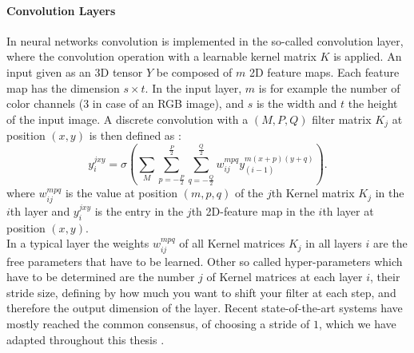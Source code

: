 \paragraph{Convolution Layers}

In neural networks convolution is implemented in the so-called convolution layer, where the convolution operation with a learnable kernel matrix $K$ is applied. An input given as an 3D tensor $Y$ be composed of $m$ 2D feature maps. Each feature map has the dimension $s \times t$. In the input layer, $m$ is for example the number of color channels (3 in case of an RGB image), and $s$ is the width and $t$ the height of the input image. A discrete convolution with a $(M , P , Q)$ filter matrix $K_j$ at position $(x,y)$ is then defined as : 
\[
y_{i}^{jxy} = \sigma(\sum_M \sum_{p=-\frac{P}{2}}^{\frac{P}{2}} \sum_{q=-\frac{Q}{2}}^{\frac{Q}{2}} w_{ij}^{mpq} y_{(i-1)}^{m(x+p)(y+q)}) .
\]
where $w_{ij}^{mpq}$ is the value at position $(m,p,q)$ of the $j$th Kernel matrix $K_j$ in the $i$th layer and $y_{i}^{jxy}$ is the entry in the $j$th 2D-feature map in the $i$th layer at position $(x, y)$.\\
In a typical layer the weights $w_{ij}^{mpq}$ of all Kernel matrices $K_j$ in all layers $i$ are the free parameters that have to be learned. Other so called hyper-parameters which have to be determined are the number $j$ of Kernel matrices at each layer $i$, their stride size, defining by how much you want to shift your filter at each step, and therefore the output dimension of the layer.
Recent state-of-the-art systems have mostly reached the common consensus, of choosing a stride of $1$, which we have adapted throughout this thesis \cite{simonyan2014very}.




